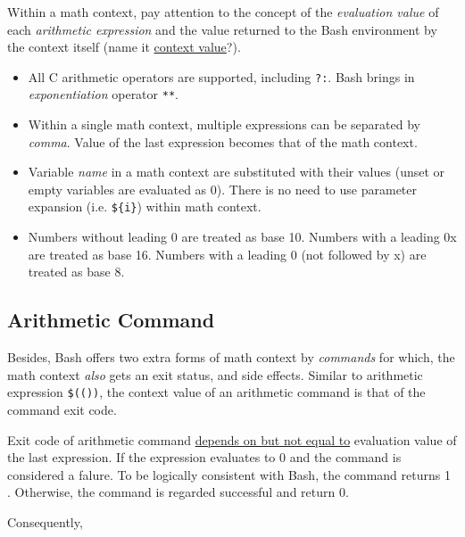 Within a math context, pay attention to the concept of the
\textit{evaluation value} of each \textit{arithmetic expression}
and the value returned to the Bash environment by the context
itself (name it \uline{context value}?).

\begin{itemize}
\item All C arithmetic operators are supported, including
  \verb|?:|. Bash brings in \textit{exponentiation} operator
  \verb|**|.
\item Within a single math context, multiple expressions can be
  separated by \textit{comma}. Value of the last expression
  becomes that of the math context.
\item Variable \textit{name} in a math context are substituted
  with their values (unset or empty variables are evaluated as
  0). There is no need to use parameter expansion
  (i.e. \verb|${i}|) within math context.
\item Numbers without leading 0 are treated as base 10. Numbers
  with a leading 0x are treated as base 16. Numbers with a leading
  0 (not followed by x) are treated as base 8.
\end{itemize}

\subsection{Arithmetic Command}
\label{sec:bash-arithmetic-command}

Besides, Bash offers two extra forms of math context by
\textit{commands} for which, the math context \textit{also} gets
an exit status, and side effects. Similar to arithmetic expression
\lstinline|$(())|, the context value of an arithmetic command is
that of the command exit code.

Exit code of arithmetic command \uline{depends on but not equal
  to} evaluation value of the last expression. If the
expression evaluates to 0 and the command is considered a falure. To
be logically consistent with Bash, the command returns 1
. Otherwise, the command is regarded successful and return
0.

Consequently,

